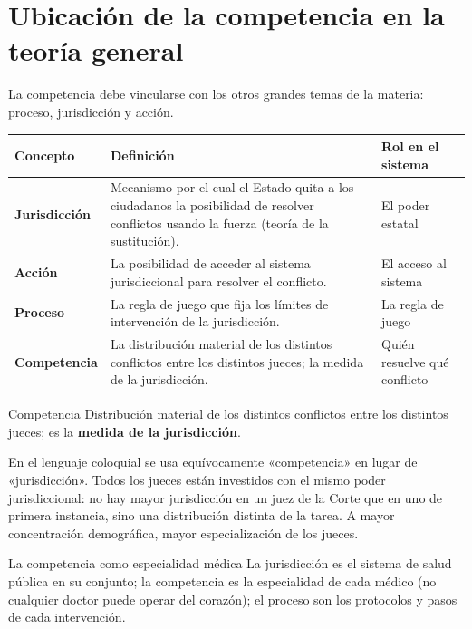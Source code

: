 \documentclass[12pt,oneside]{book}
\renewcommand{\arraystretch}{1.15}
\begin{document}
\section{Ubicación de la competencia en la teoría general}

La competencia debe vincularse con los otros grandes temas de la materia: proceso, jurisdicción y acción.

\begin{table}[H]
\centering
\renewcommand{\arraystretch}{1.3}
\begin{tabularx}{\textwidth}{>{\RaggedRight\arraybackslash}p{}>{\RaggedRight\arraybackslash}X>{\RaggedRight\arraybackslash}p{}}
\toprule
\textbf{Concepto} & \textbf{Definición} & \textbf{Rol en el sistema} \\
\midrule
\textbf{Jurisdicción} & Mecanismo por el cual el Estado quita a los ciudadanos la posibilidad de resolver conflictos usando la fuerza (teoría de la sustitución). & El poder estatal \\
\addlinespace
\textbf{Acción} & La posibilidad de acceder al sistema jurisdiccional para resolver el conflicto. & El acceso al sistema \\
\addlinespace
\textbf{Proceso} & La regla de juego que fija los límites de intervención de la jurisdicción. & La regla de juego \\
\addlinespace
\textbf{Competencia} & La distribución material de los distintos conflictos entre los distintos jueces; la medida de la jurisdicción. & Quién resuelve qué conflicto \\
\bottomrule
\end{tabularx}
\end{table}

\begin{definition}{Competencia}
Distribución material de los distintos conflictos entre los distintos jueces; es la \textbf{medida de la jurisdicción}.
\end{definition}

En el lenguaje coloquial se usa equívocamente «competencia» en lugar de «jurisdicción». Todos los jueces están investidos con el mismo poder jurisdiccional: no hay mayor jurisdicción en un juez de la Corte que en uno de primera instancia, sino una distribución distinta de la tarea. A mayor concentración demográfica, mayor especialización de los jueces.

\begin{example}{La competencia como especialidad médica}
La jurisdicción es el sistema de salud pública en su conjunto; la competencia es la especialidad de cada médico (no cualquier doctor puede operar del corazón); el proceso son los protocolos y pasos de cada intervención.
\end{example}
\end{document}
